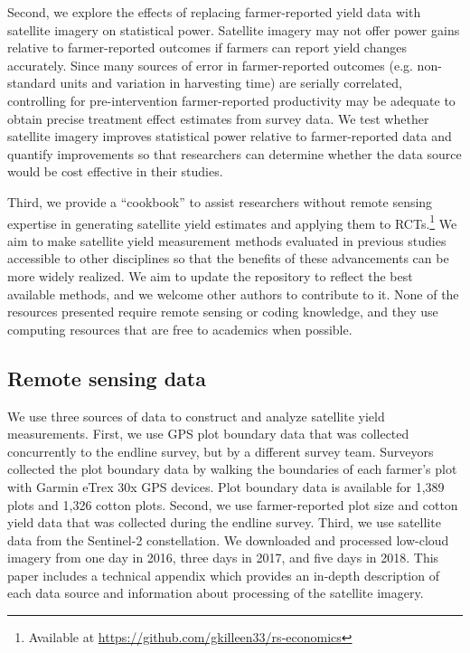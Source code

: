 \documentclass{article}
\begin{document}
Second, we explore the effects of replacing farmer-reported yield data with satellite imagery on statistical power. Satellite imagery may not offer power gains relative to farmer-reported outcomes if farmers can report yield changes accurately. Since many sources of error in farmer-reported outcomes (e.g. non-standard units and variation in harvesting time) are serially correlated, controlling for pre-intervention farmer-reported productivity may be adequate to obtain precise treatment effect estimates from survey data. We test whether satellite imagery improves statistical power relative to farmer-reported data and quantify improvements so that researchers can determine whether the data source would be cost effective in their studies. 

Third, we provide a ``cookbook'' to assist researchers without remote sensing expertise in generating satellite yield estimates and applying them to RCTs.\footnote{Available at \url{https://github.com/gkilleen33/rs-economics}} We aim to make satellite yield measurement methods evaluated in previous studies accessible to other disciplines so that the benefits of these advancements can be more widely realized. We aim to update the repository to reflect the best available methods, and we welcome other authors to contribute to it. None of the resources presented require remote sensing or coding knowledge, and they use computing resources that are free to academics when possible. 

\subsection{Remote sensing data}

We use three sources of data to construct and analyze satellite yield measurements. First, we use GPS plot boundary data that was collected concurrently to the endline survey, but by a different survey team. Surveyors collected the plot boundary data by walking the boundaries of each farmer’s plot with Garmin eTrex 30x GPS devices. Plot boundary data is available for 1,389 plots and 1,326 cotton plots. Second, we use farmer-reported plot size and cotton yield data that was collected during the endline survey. Third, we use satellite data from the Sentinel-2 constellation. We downloaded and processed low-cloud imagery from one day in 2016, three days in 2017, and five days in 2018. This paper includes a technical appendix which provides an in-depth description of each data source and information about processing of the satellite imagery.
\end{document}

